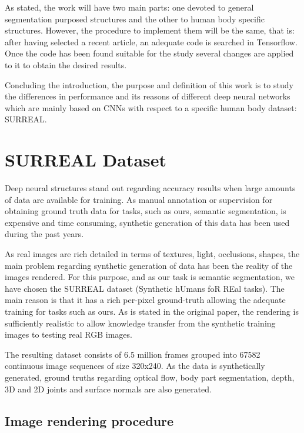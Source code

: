 As stated, the work will have two main parts: one devoted to general segmentation purposed structures and the other to human body specific structures. However, the procedure to implement them will be the same, that is: after having selected a recent article, an adequate code is searched in Tensorflow. Once the code has been found suitable for the study several changes are applied to it to obtain the desired results.\newline

Concluding the introduction, the purpose and definition of this work is to study the differences in performance  and its reasons of different deep neural networks which are mainly based on CNNs with respect to a specific human body dataset: SURREAL. \\


\section{SURREAL Dataset}

Deep neural structures stand out regarding accuracy results when large amounts of data are available for training. As manual annotation or supervision for obtaining ground truth data for tasks, such as ours, semantic segmentation, is expensive and time consuming, synthetic generation of this data has been used during the past years.\newline

As real images are rich detailed in terms of textures, light, occlusions, shapes, the main problem regarding synthetic generation of data has been the reality of the images rendered. For this purpose, and as our task is semantic segmentation, we have chosen the SURREAL dataset (Synthetic hUmans foR REal tasks). The main reason is that it has a rich per-pixel ground-truth  allowing the adequate training for tasks such as ours. As is stated in the original paper, the rendering is sufficiently realistic to allow knowledge transfer from the synthetic training images to testing real RGB images. \newline

The resulting dataset consists of 6.5 million frames grouped into 67582 continuous image sequences of size 320x240. As the data is synthetically generated, ground truths regarding optical flow, body part segmentation, depth, 3D and 2D joints and surface normals are also generated.
 
\subsection{Image rendering procedure}

